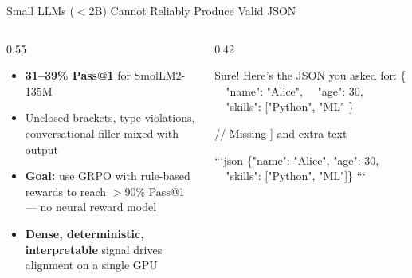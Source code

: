 \documentclass[10pt, aspectratio=169]{beamer}
\begin{document}
\begin{frame}{Small LLMs ($<$2B) Cannot Reliably Produce Valid JSON}
  \begin{columns}[T]
    \begin{column}{0.55\textwidth}
      \begin{itemize}
        \setlength\itemsep{0.7em}
        \item[\textcolor{warn}{\faTimesCircle}] \textbf{31–39\% Pass@1} for SmolLM2-135M
        \item[\textcolor{warn}{\faTimesCircle}] Unclosed brackets, type violations,
              conversational filler mixed with output
        \item[\textcolor{sky}{\faAngleRight}] \textbf{Goal:} use GRPO with rule-based rewards
              to reach $>$90\% Pass@1 — no neural reward model
        \item[\textcolor{sky}{\faAngleRight}] \textbf{Dense, deterministic, interpretable} signal
              drives alignment on a single GPU
      \end{itemize}
    \end{column}
    \begin{column}{0.42\textwidth}
      \begin{tcolorbox}[codebox, title={\color{warn}\faTimesCircle~Typical failure}, fonttitle=\scriptsize\bfseries, coltitle=warn]
Sure! Here's the JSON you asked for:
\{
~~"name": "Alice",
~~"age": 30,
~~"skills": ["Python", "ML"
\}

\textcolor{warn}{// Missing ] and extra text}
      \end{tcolorbox}
      \vspace{0.4em}
      \begin{tcolorbox}[codebox, title={\color{accent}\faCheckCircle~Expected output}, fonttitle=\scriptsize\bfseries, coltitle=accent]
```json
\{"name": "Alice", "age": 30,
~~"skills": ["Python", "ML"]\}
```
      \end{tcolorbox}
    \end{column}
  \end{columns}
\end{frame}
\end{document}
